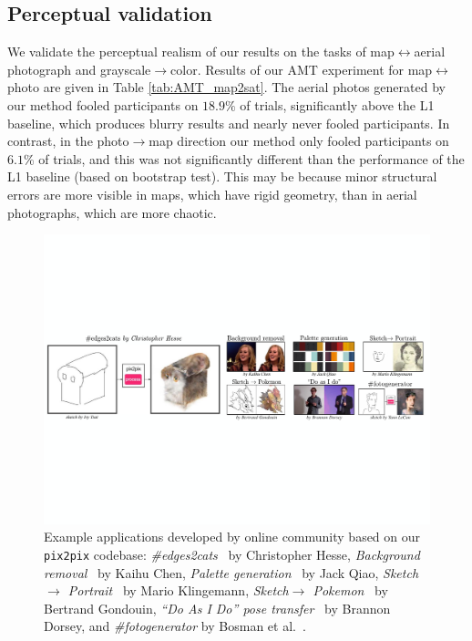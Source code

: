 \documentclass[10pt,twocolumn,letterpaper]{article}
\begin{document}
\subsection{Perceptual validation}

We validate the perceptual realism of our results on the tasks of map$\leftrightarrow$aerial photograph and grayscale$\rightarrow$color. Results of our AMT experiment for map$\leftrightarrow$photo are given in Table \ref{tab:AMT_map2sat}. The aerial photos generated by our method fooled participants on $18.9\%$ of trials, significantly above the L1 baseline, which produces blurry results and nearly never fooled participants. In contrast, in the photo$\rightarrow$map direction our method only fooled participants on $6.1$\% of trials, and this was not significantly different than the performance of the L1 baseline (based on bootstrap test). This may be because minor structural errors are more visible in maps, which have rigid geometry, than in aerial photographs, which are more chaotic.



\begin{figure}[h]
    \centering
    \includegraphics[width=1.0\hsize]{figs/community_fig.pdf}
    \vspace{-0.3in}
    \caption{Example applications developed by online community based on our {\tt pix2pix} codebase: \emph{\#edges2cats}~\cite{edges2cats} by Christopher Hesse, \emph{Background removal}~\cite{background} by Kaihu Chen, \emph{Palette generation}~\cite{palette} by Jack Qiao, \emph{Sketch $\rightarrow$ Portrait}~\cite{sketch2portrait} by Mario Klingemann, \emph{Sketch$\rightarrow$ Pokemon}~\cite{sketch2pokemon} by Bertrand Gondouin, \emph{``Do As I Do'' pose transfer}~\cite{pose} by Brannon Dorsey, and \emph{\#fotogenerator} by Bosman et al.~\cite{fotogenerator}.}
    \label{twitter}
    \vspace{-0.2in}
\end{figure}
\end{document}
